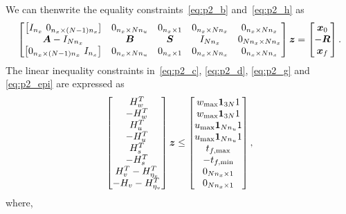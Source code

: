 \documentclass[10pt]{article}
\begin{document}
We can thenwrite the equality constraints~\eqref{eq:p2_b} and~\eqref{eq:p2_h} as
\begin{equation}
\begin{bmatrix}
\big[ I_{n_x} \ 0_{n_x \times (N-1)n_x}] & 0_{n_x \times N n_u} & 0_{n_x \times 1} & 0_{n_x \times N n_x} & 0_{n_x \times N n_x} \\
\bm{A} - I_{N n_x} & \bm{B} & \bm{S} & I_{N n_x} & 0_{N n_x \times N n_x} \\
\big[ 0_{n_x \times (N-1)n_x} \ I_{n_x} \big] & 0_{n_x \times N n_u} & 0_{n_x \times 1} & 0_{n_x \times Nn_x} & 0_{n_x \times N n_x}
\end{bmatrix} \bm{z} = \begin{bmatrix}
\bm{x}_0 \\ -\bm{R} \\ \bm{x}_f
\end{bmatrix}.
\label{eq:std_equality}
\end{equation}
The linear inequality constraints in~\eqref{eq:p2_c}, \eqref{eq:p2_d}, \eqref{eq:p2_g} and \eqref{eq:p2_epi} are expressed as
\begin{equation}
\begin{bmatrix}
H_w^T \\ - H_w^T \\ H_u^T \\ - H_u^T \\ H_s^T \\ - H_s^T \\ H_v^T - H_{\eta_v}^T \\ -H_v - H_{\eta_v}^T
\end{bmatrix} \bm{z} \leq \begin{bmatrix}
w_{\max} \bm{1}_{3N}{1} \\ w_{\max} \bm{1}_{3N}{1} \\ u_{\max} \bm{1}_{N n_u}{1} \\ u_{\max} \bm{1}_{N n_u}{1} \\ t_{f,\max} \\ -t_{f,\min} \\ 0_{N n_x \times 1} \\ 0_{N n_x \times 1}
\end{bmatrix},
\label{eq:std_ineq_lin}
\end{equation}
where,
\end{document}

